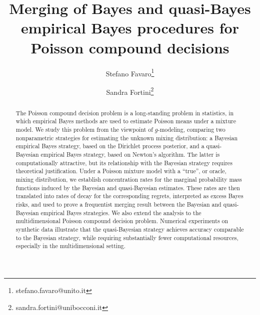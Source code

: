\documentclass[twoside,12pt]{article}
\begin{document}
\title{Merging of Bayes and quasi-Bayes empirical Bayes procedures for Poisson compound decisions}


\author[1]{Stefano Favaro\thanks{stefano.favaro@unito.it}}
\author[2]{Sandra Fortini\thanks{sandra.fortini@unibocconi.it}}

\maketitle

\begin{abstract}
The Poisson compound decision problem is a long-standing problem in statistics, in which empirical Bayes methods are used to estimate Poisson means under a mixture model. We study this problem from the viewpoint of $g$-modeling, comparing two nonparametric strategies for estimating the unknown mixing distribution: a Bayesian empirical Bayes strategy, based on the Dirichlet process posterior, and a quasi-Bayesian empirical Bayes strategy, based on Newton's algorithm. The latter is computationally attractive, but its relationship with the Bayesian strategy requires theoretical justification. Under a Poisson mixture model with a ``true'', or oracle, mixing distribution, we establish concentration rates for the marginal probability mass functions induced by the Bayesian and quasi-Bayesian estimates. These rates are then translated into rates of decay for the corresponding regrets, interpreted as excess Bayes risks, and used to prove a frequentist merging result between the Bayesian and quasi-Bayesian empirical Bayes strategies. We also extend the analysis to the multidimensional Poisson compound decision problem. Numerical experiments on synthetic data illustrate that the quasi-Bayesian
strategy achieves accuracy comparable to the Bayesian strategy, while requiring substantially fewer computational resources, especially in the multidimensional setting.
\end{abstract}
\end{document}
